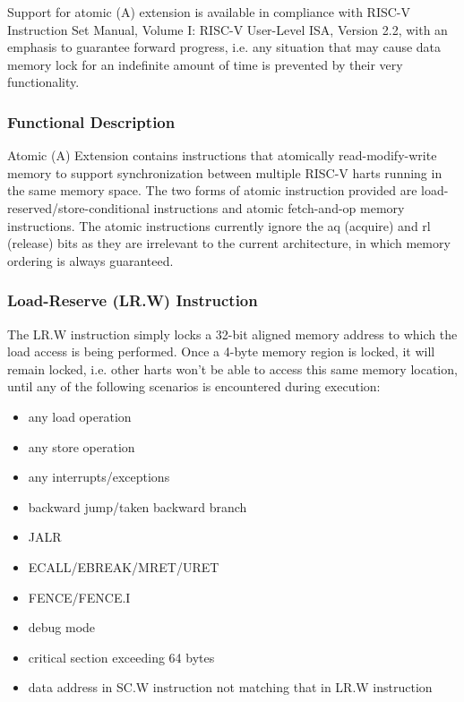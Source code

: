 \documentclass[main\_\_EN.tex]{subfiles}
\begin{document}
Support for atomic (A) extension is available in compliance with RISC-V Instruction Set Manual, Volume I: RISC-V User-Level ISA, Version 2.2, with an emphasis to guarantee forward progress, i.e. any situation that may cause data memory lock for an indefinite amount of time is prevented by their very functionality.

\subsubsection{Functional Description}
\label{sec:riscvcpu-atomic-func-descr}

Atomic (A) Extension contains instructions that atomically read-modify-write memory to support synchronization between multiple RISC-V harts running in the same memory space. The two forms of atomic instruction provided are load-reserved/store-conditional instructions and atomic fetch-and-op memory instructions. The atomic instructions currently ignore the aq (acquire) and rl (release) bits as they are irrelevant to the current architecture, in which memory ordering is always guaranteed.

\subsubsection{Load-Reserve (LR.W) Instruction}
\label{sec:riscvcpu-atomic-lr}

The LR.W instruction simply locks a 32-bit aligned memory address to which the load access is being performed. Once a 4-byte memory region is locked, it will remain locked, i.e. other harts won't be able to access this same memory location, until any of the following scenarios is encountered during execution:

\begin{itemize}
    \item any load operation
    \item any store operation
    \item any interrupts/exceptions
    \item backward jump/taken backward branch
    \item JALR
    \item ECALL/EBREAK/MRET/URET
    \item FENCE/FENCE.I
    \item debug mode
    \item critical section exceeding 64 bytes
    \item data address in SC.W instruction not matching that in LR.W instruction
\end{itemize}
\end{document}
